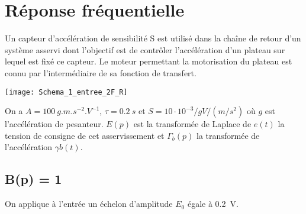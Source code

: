 %
%
%
%


\section*{Réponse fréquentielle}

Un capteur d'accélération de sensibilité S est utilisé dans la chaîne de retour d'un système asservi dont l'objectif est de contrôler l'accélération d'un plateau sur lequel est fixé ce capteur. Le moteur permettant la motorisation du plateau est connu par l'intermédiaire de sa fonction de transfert. 


\begin{center}
\texttt{[image: Schema\_1\_entree\_2F\_R]}
\end{center}

On a  $A = \SI{100}{g.m.s^{-2}.V^{-1}}$, $\tau=\SI{0,2}{s}$ et $S = 10\cdot 10^{-3}/g V/(m/s^2)$ où $g$ est l'accélération de pesanteur. $E(p)$ est la transformée de Laplace de $e(t)$ la tension de consigne de cet asservissement et $\Gamma_b(p)$ la transformée de l'accélération $\gamma b(t)$.

\subsection*{B(p) = 1}
On applique à l'entrée un échelon d'amplitude $E_0$ égale à \SI{0,2}{V}.


%
%



